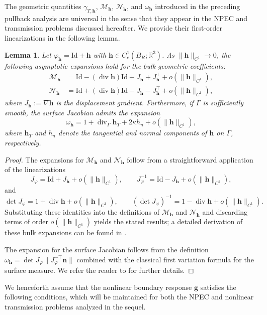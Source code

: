 \documentclass[10pt,a4paper]{amsart}
\newtheorem{lemm}[theo]{Lemma}
\numberwithin{equation}{section}
\begin{document}
The geometric quantities $\gamma_{T,\mathbf{h}}$, $\mathcal{M}_{\mathbf{h}}$, $\mathcal{N}_{\mathbf{h}}$, and $\omega_{\mathbf{h}}$ introduced in the preceding pullback analysis are universal in the sense that they appear in the NPEC and transmission problems discussed hereafter. We provide their first-order linearizations in the following lemma.

\begin{lemm}\label{le:positive}
Let $\varphi_{\mathbf{h}} = \mathrm{Id} + \mathbf{h}$ with $\mathbf{h} \in C_c^1(B_R; \mathbb{R}^3)$. As $\|\mathbf{h}\|_{C^1} \to 0$, the following asymptotic expansions hold for the bulk geometric coefficients:
\begin{align*}
\mathcal{M}_{\mathbf{h}} &= \mathrm{Id} - (\operatorname{div}\mathbf{h})\mathrm{Id} + J_{\mathbf{h}} + J_{\mathbf{h}}^{\top} + o(\|\mathbf{h}\|_{C^1}), \\
\mathcal{N}_{\mathbf{h}} &= \mathrm{Id} + (\operatorname{div}\mathbf{h})\mathrm{Id} - J_{\mathbf{h}} - J_{\mathbf{h}}^{\top} + o(\|\mathbf{h}\|_{C^1}),
\end{align*}
where $J_{\mathbf{h}} := \nabla\mathbf{h}$ is the displacement gradient. Furthermore, if $\Gamma$ is sufficiently smooth, the surface Jacobian admits the expansion
\[
\omega_{\mathbf{h}} = 1 + \operatorname{div}_\Gamma\mathbf{h}_T + 2\kappa h_n + o(\|\mathbf{h}\|_{C^1}),
\]
where $\mathbf{h}_T$ and $h_n$ denote the tangential and normal components of $\mathbf{h}$ on $\Gamma$, respectively.
\end{lemm}


\begin{proof}
The expansions for $\mathcal{M}_{\mathbf{h}}$ and $\mathcal{N}_{\mathbf{h}}$ follow from a straightforward application of the linearizations
\[
J_{\varphi} = \mathrm{Id} + J_{\mathbf{h}} + o(\|\mathbf{h}\|_{C^1}), \qquad J_{\varphi}^{-1} = \mathrm{Id} - J_{\mathbf{h}} + o(\|\mathbf{h}\|_{C^1}),
\]
and
\[
\det J_{\varphi} = 1 + \operatorname{div} \mathbf{h} + o(\|\mathbf{h}\|_{C^1}), \qquad (\det J_{\varphi})^{-1} = 1 - \operatorname{div} \mathbf{h} + o(\|\mathbf{h}\|_{C^1}).
\]
Substituting these identities into the definitions of $\mathcal{M}_{\mathbf{h}}$ and $\mathcal{N}_{\mathbf{h}}$ and discarding terms of order $o(\|\mathbf{h}\|_{C^1})$ yields the stated results; a detailed derivation of these bulk expansions can be found in \cite{Hettlich2012}.

The expansion for the surface Jacobian follows from the definition $\omega_{\mathbf{h}} = \det J_{\varphi} \|J_{\varphi}^{-\top} \mathbf{n}\|$ combined with the classical first variation formula for the surface measure. We refer the reader to \cite[Chapter~9]{Delfour2011} for further details.
\end{proof}
We henceforth assume that the nonlinear boundary response $\mathbf{g}$ satisfies the following conditions, which will be maintained for both the NPEC and nonlinear transmission problems analyzed in the sequel.
\end{document}
